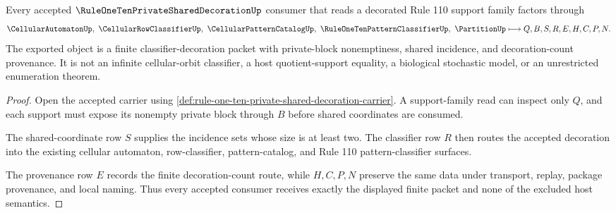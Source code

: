 \begin{theorem}
\label{thm:rule-one-ten-private-shared-decoration-classifier-handoff}
Every accepted $\RuleOneTenPrivateSharedDecorationUp$ consumer that reads a decorated Rule 110 support family factors through
$$
\CellularAutomatonUp,\ \CellularRowClassifierUp,\ \CellularPatternCatalogUp,\ \RuleOneTenPatternClassifierUp,\ \PartitionUp
\longmapsto
Q,B,S,R,E,H,C,P,N .
$$
The exported object is a finite classifier-decoration packet with private-block nonemptiness, shared incidence, and decoration-count provenance. It is not an infinite cellular-orbit classifier, a host quotient-support equality, a biological stochastic model, or an unrestricted enumeration theorem.
\end{theorem}
\begin{proof}
Open the accepted carrier using \autoref{def:rule-one-ten-private-shared-decoration-carrier}. A support-family read can inspect only $Q$, and each support must expose its nonempty private block through $B$ before shared coordinates are consumed.

The shared-coordinate row $S$ supplies the incidence sets whose size is at least two. The classifier row $R$ then routes the accepted decoration into the existing cellular automaton, row-classifier, pattern-catalog, and Rule 110 pattern-classifier surfaces.

The provenance row $E$ records the finite decoration-count route, while $H,C,P,N$ preserve the same data under transport, replay, package provenance, and local naming. Thus every accepted consumer receives exactly the displayed finite packet and none of the excluded host semantics.
\end{proof}




